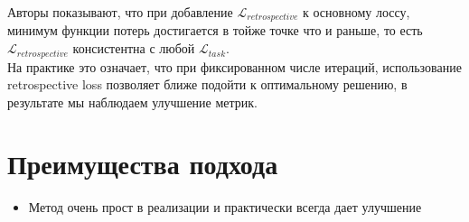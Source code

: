 Авторы показывают, что при добавление $\mathcal{L}_{retrospective}$ к основному лоссу, минимум функции потерь достигается в тойже точке что и раньше, то есть $\mathcal{L}_{retrospective}$ консистентна с любой $\mathcal{L}_{task}$. \\

На практике это означает, что при фиксированном числе итераций, использование retrospective loss позволяет ближе подойти к оптимальному решению, в результате мы наблюдаем улучшение метрик.

\section*{Преимущества подхода}

\begin{itemize}
    \item Метод очень прост в реализации и практически всегда дает улучшение
\end{itemize}